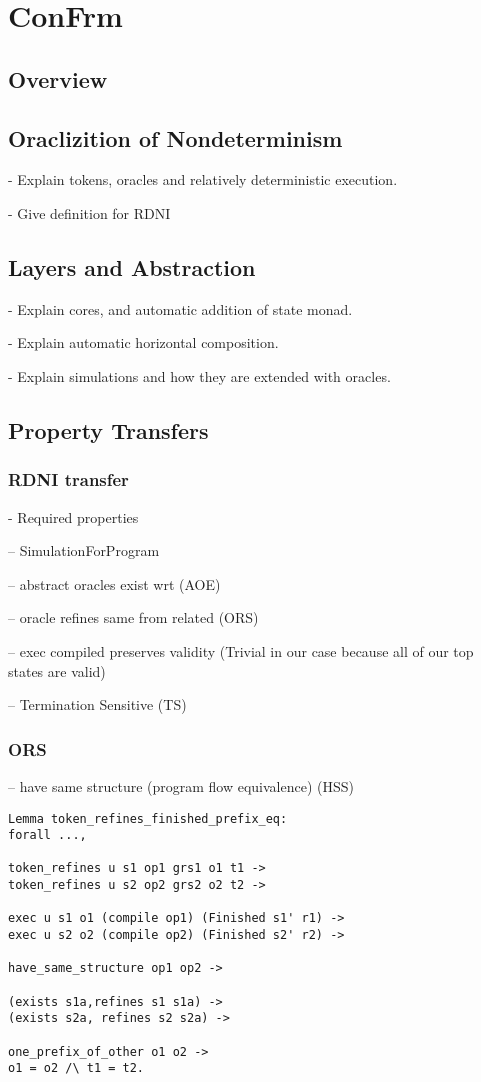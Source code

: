 \chapter{ConFrm}

\section{Overview}

\section{Oraclizition of Nondeterminism}
- Explain tokens, oracles and relatively deterministic execution.

- Give definition for RDNI

\section{Layers and Abstraction}

- Explain cores, and automatic addition of state monad.

- Explain automatic horizontal composition.

- Explain simulations and how they are extended with oracles.

\section{Property Transfers}


\subsection{RDNI transfer}
- Required properties

-- SimulationForProgram
    
-- abstract oracles exist wrt (AOE)

-- oracle refines same from related (ORS)

-- exec compiled preserves validity (Trivial in our case because all of our top states are valid)

-- Termination Sensitive (TS)

\subsection{ORS}
-- have same structure (program flow equivalence) (HSS)

\begin{verbatim}
Lemma token_refines_finished_prefix_eq:
forall ...,

token_refines u s1 op1 grs1 o1 t1 ->
token_refines u s2 op2 grs2 o2 t2 ->

exec u s1 o1 (compile op1) (Finished s1' r1) ->
exec u s2 o2 (compile op2) (Finished s2' r2) ->

have_same_structure op1 op2 -> 

(exists s1a,refines s1 s1a) ->
(exists s2a, refines s2 s2a) ->

one_prefix_of_other o1 o2 ->
o1 = o2 /\ t1 = t2.
\end{verbatim}

